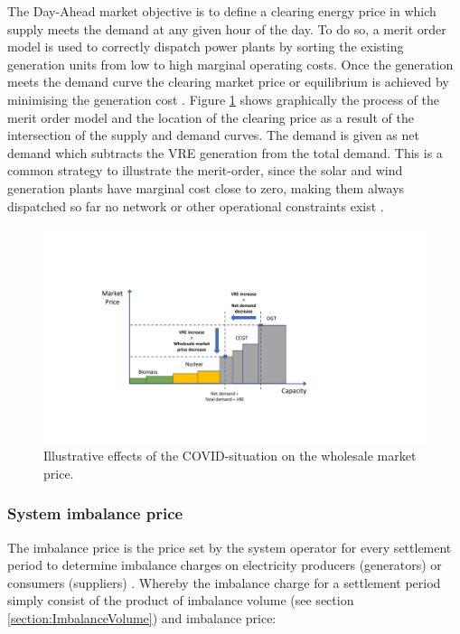 \documentclass[energies,article,submit,moreauthors,pdftex]{Definitions/mdpi}
\begin{document}
The Day-Ahead market objective is to define a clearing energy price in which supply meets the demand at any given hour of the day. To do so, a merit order model is used to correctly dispatch power plants by sorting the existing generation units from low to high marginal operating costs. Once the generation meets the demand curve the clearing market price or equilibrium is achieved by minimising the generation cost \cite{Maekawa2018TheExchange}. Figure \ref{fig:wholesale-market-effects} shows graphically the process of the merit order model and the location of the clearing price as a result of the intersection of the supply and demand curves. The demand is given as net demand which subtracts the VRE generation from the total demand. This is a common strategy to illustrate the merit-order, since the solar and wind generation plants have marginal cost close to zero, making them always dispatched so far no network or other operational constraints exist \cite{Hirth2014TheVariability}. 

\begin{figure}[H]
\centering
\hspace{-25pt}
\includegraphics[trim={4cm 3cm 3.5cm 4.5cm},clip,width=1.3\textwidth]{Graphics/Wholesale-market-price.pdf}
\caption{Illustrative effects of the COVID-situation on the wholesale market price.}
\label{fig:wholesale-market-effects}
\end{figure} 


\subsubsection{System imbalance price}\label{sec:system imbalance price}

The imbalance price is the price set by the system operator for every settlement period to determine imbalance charges on electricity producers (generators) or consumers (suppliers) \cite{ELEXON2019GuidanceBritain}. Whereby the imbalance charge for a settlement period simply consist of the product of imbalance volume (see section \ref{section:ImbalanceVolume}) and imbalance price:
\end{document}
